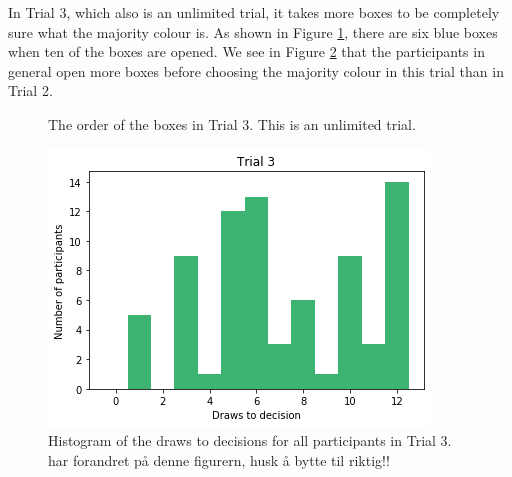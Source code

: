 In Trial 3, which also is an unlimited trial, it takes more boxes to be completely sure what the majority colour is. As shown in Figure \ref{fig:trial3_order}, there are six blue boxes when ten of the boxes are opened. We see in Figure \ref{fig:histogram_trial3} that the participants in general open more boxes before choosing the majority colour in this trial than in Trial 2. 

\begin{figure}
    \centering
    \scalebox{0.8}{}
    \caption[Order of Boxes in Trial 3]{The order of the boxes in Trial 3. This is an unlimited trial.}
    \label{fig:trial3_order}
\end{figure}

\begin{figure}
    \centering
    \includegraphics[scale=0.6]{pictures/dtd3_histogram.png}
    \caption[Draws to Decisions in Trial 3]{Histogram of the draws to decisions for all participants in Trial 3. 
    har forandret på denne figurern, husk å bytte til riktig!!}
    \label{fig:histogram_trial3}
\end{figure}

